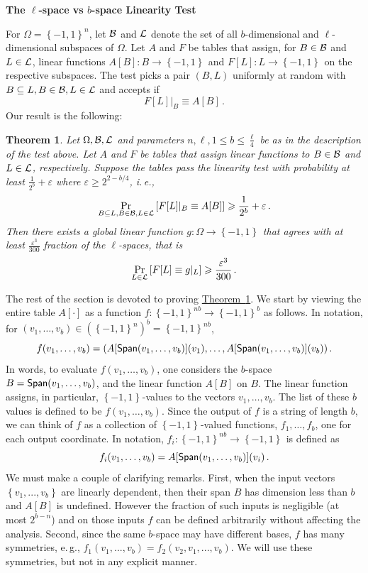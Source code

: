 \documentclass[11pt]{article}
\numberwithin{equation}{section}
\newtheorem{theorem}{Theorem}[section]
\theoremstyle{definition}
\theoremstyle{plain}
\newcommand{\ie}{i.\,e.}
\newcommand{\eg}{e.\,g.}
\newcommand{\expref}[2]{\hyperref[#2]{#1~\ref{#2}}}
\newcommand\set[1]{{\left\{ #1 \right\}}}
\newcommand\Prob[2]{{\Pr_{#1}\left[ {#2} \right]}}
\newcommand\cube[1]{ { \set{-1,1}^{#1} } }
\newcommand\eps{\varepsilon}
\renewcommand\geq{\geqslant}
\renewcommand\leq{\leqslant}
\begin{document}
\begin{center} {\bf  The $\ell$-space vs $b$-space Linearity Test }
\end{center}
For  $\Omega = \cube{n}$, let ${\cal B}$  and ${\cal L}$ denote the set of all $b$-dimensional and $\ell$-dimensional
subspaces of $\Omega$. Let %
$A$ and $F$  %
be tables that assign, for
%
$B \in {\cal B}$ and $L \in {\cal L}$, %
%
linear functions %
$A[B]:B \to \cube{}$ and $F[L]:L \to \cube{}$  %
on the respective subspaces.  %
 The test picks a pair
$(B,L)$ uniformly at random with $B \subseteq L, B \in {\cal B}, L \in {\cal L}$
and accepts
if %
%
%
 $$  F[L]|_B \equiv  A[B]\,.$$%
Our result is the following:
\begin{theorem}\label{thm:linearity_dec}
Let $\Omega, {\cal B}, {\cal L}$ and parameters $n, \ell, 1 \leq b \leq \frac{\ell}{4}$
be as in the description of
the test above. Let %
$A$ and $F$  %
be tables that assign linear functions to $B \in {\cal B}$ and
$L \in {\cal L}$, respectively.  %
Suppose the tables pass the linearity test with probability at least
$\frac{1}{2^b}+\eps$ where
$\eps \geq 2^{2-b/4}$, \ie,
\[
\Prob{B\subseteq  L, B \in {\cal B}, L \in {\cal L}}{F[L]|_B\equiv A[B]}\geqslant \frac{1}{2^b}+\eps\,.%
\]
Then there exists a global linear function $g: \Omega \to \cube{} $ that agrees with at least $\frac{\eps^3}{300}$ fraction of the $\ell$-spaces,
that is
\[
\Prob{L\in {\cal L} }{F[L]\equiv g|_L}\geqslant \frac{\eps^3}{300}\,.%
\]
\end{theorem}


The rest of the section is devoted to proving \expref{Theorem}{thm:linearity_dec}. We start by viewing the entire table $A[\cdot]$ as
a function $f: \cube{nb} \to \cube{b}$ as follows. In notation, for $(v_1, \ldots, v_b) \in (\cube{n})^b = \cube{nb}$,
 $$ f(v_1,\ldots,v_b) = ( A[{\sf Span}(v_1,\ldots,v_b)] (v_1), \ldots, A[{\sf Span}(v_1,\ldots,v_b)] (v_b) )\,. $$%
In words, to evaluate  $f(v_1, \ldots, v_b)$, one considers the $b$-space $B= {\sf Span}(v_1,\ldots,v_b)$, and the
linear function $A[B]$ on $B$. The linear function assigns, in particular, $\cube{}$-values to the vectors
$v_1, \ldots, v_b$.  %
%
The list of these $b$ values is defined to be $f(v_1,\ldots,v_b)$. Since the output
of $f$ is a string of length $b$, we can think of $f$ as a collection of $\cube{}$-valued functions,
$f_1,\ldots,f_b$, one for each output coordinate. In notation,  $f_i: \cube{nb} \to \cube{}$ is defined as
  $$  f_i(v_1,\ldots,v_b) =  A[{\sf Span}(v_1,\ldots,v_b)] (v_i)\,. $$%
We must make
a couple of clarifying remarks.
First, when the input vectors $\set{v_1,...,v_b}$ are linearly dependent, then their span $B$ has dimension less than $b$ and $A[B]$
is undefined. However the fraction of such inputs is negligible (at most $2^{b-n}$) and on those inputs $f$ can be defined arbitrarily
without affecting the analysis. Second, since the same $b$-space may have different bases,
$f$ has many symmetries, \eg, $f_1(v_1,...,v_b)=f_2(v_2,v_1,...,v_b)$. We will use these symmetries, but not in any explicit manner.
\end{document}
